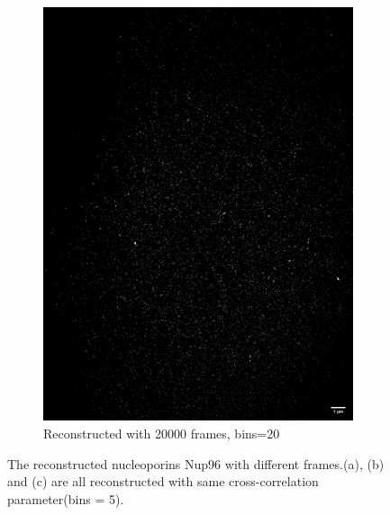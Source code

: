 \documentclass[a4paper,english,12pt,bibliography=totoc]{scrreprt}
\begin{document}
\begin{figure}[hbpt]
\begin{subfigure}[b]{0.45\textwidth}
        \includegraphics[width=\textwidth]{Images/STORM/20000frames20bins.png}
        \caption{Reconstructed with 20000 frames, bins=20}
        \label{fig:image4}
    \end{subfigure}
    \caption{The reconstructed nucleoporins Nup96 with different frames.(a), (b) and (c) are all reconstructed with same cross-correlation parameter(bins = 5).}
    \label{fig:subfigures}
\end{figure}
\end{document}
